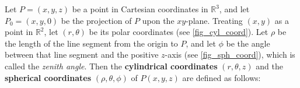 
Let $P = (x,y,z)$ be a point in Cartesian coordinates in $\mathbb{R}^{3}$, and let $P_0 = (x,y,0)$ be the projection of $P$ upon the $xy$-plane. Treating $(x,y)$ as a point in $\mathbb{R}^{2}$, let $(r,\theta)$ be its polar coordinates (see \autoref{fig_cyl_coord}). Let $\rho$ be the length of the line segment from the origin to $P$, and let $\phi$ be the angle between that line segment and the positive $z$-axis (see \autoref{fig_sph_coord}), which is called the \emph{zenith angle}. Then the \textbf{cylindrical coordinates} $(r,\theta,z)$  and the \textbf{spherical coordinates} $(\rho,\theta,\phi)$ of $P(x,y,z)$ are defined as follows:

